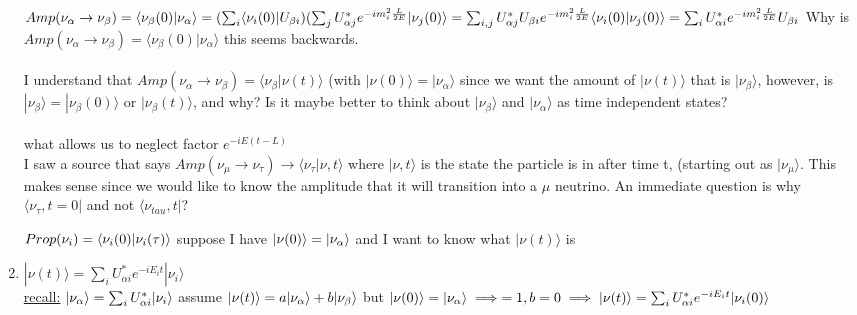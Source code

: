 \documentclass[12pt]{amsart}
\begin{document}
\begin{enumerate}
$Amp(\nu_{\alpha} \rightarrow \nu_{\beta}) = \langle \nu_{\beta} ( 0) | \nu_{\alpha} \rangle\\
= ( \sum_i \langle \nu_i (0) | U_{\beta i} ) ( \sum_j U_{\alpha j}^* e^{-i m_i^2 \frac{L}{2 E}} | \nu_j ( 0) \rangle\\
= \sum_{i,j} U_{\alpha j}^* U_{\beta i} e^{-i m_i^2 \frac{L}{2 E}} \langle \nu_i(0) | \nu_j ( 0 ) \rangle\\
= \sum_i U_{\alpha i}^* e^{-i m_i^2 \frac{L}{2 E}} U_{\beta i}\\$
Why is $Amp (\nu_{\alpha} \rightarrow \nu_{\beta} ) = \langle \nu_{\beta} ( 0) | \nu_{\alpha} \rangle$ this seems backwards.\\
\\
I understand that $Amp(\nu_{\alpha} \rightarrow \nu_{\beta})= \langle \nu_{\beta} | \nu (t) \rangle$ (with $|\nu (0) \rangle = | \nu_{\alpha} \rangle$ since we want the amount of $| \nu (t) \rangle$ that is $|\nu_{\beta} \rangle$, however, is $| \nu_{\beta} \rangle = | \nu_{\beta} (0) \rangle$ or $| \nu_{\beta} (t) \rangle$, and why? Is it maybe better to think about $| \nu_{\beta} \rangle$ and $| \nu_{\alpha} \rangle$ as time independent states?\\
\\
what allows us to neglect factor $e^{-i E(t-L)}$\\
I saw a source that says $Amp(\nu_{\mu} \rightarrow \nu_{\tau}) \rightarrow \langle \nu_{\tau} | \nu, t \rangle$ where $| \nu, t \rangle$ is the state the particle is in after time t, (starting out as $|\nu_{\mu} \rangle$. This makes sense since we would like to know the amplitude that it will transition into a $\mu$ neutrino. An immediate question is why $\langle \nu_{\tau}, t=0 |$ and not $\langle \nu_{tau}, t|$?


\hdashrule[0.5ex][c]{\linewidth}{0.5pt}{1.5mm}


$Prop(\nu_i) = \langle \nu_i ( 0 ) | \nu_i ( \tau) \rangle\\$
suppose I have $| \nu(0) \rangle = | \nu_{\alpha} \rangle\\$
and I want to know what $| \nu(t) \rangle$ is\\


\hdashrule[0.5ex][c]{\linewidth}{0.5pt}{1.5mm}


\item \underline{$|\nu(t) \rangle = \sum_i U_{\alpha i}^* e^{-iE_i t} | \nu_i \rangle$}\\
\underline{recall:} $| \nu_{\alpha} \rangle = \sum_i U_{\alpha i}^* | \nu_i \rangle\\$
assume $|\nu(t) \rangle = a | \nu_{\alpha} \rangle + b | \nu_{\beta} \rangle\\$
but $| \nu(0) \rangle = | \nu_{\alpha} \rangle \implies =1, b=0\\
\implies | \nu(t) \rangle = \sum_i U_{\alpha i}^* e^{-i E_i t} | \nu_i ( 0) \rangle\\$



\end{enumerate}
\end{document}

